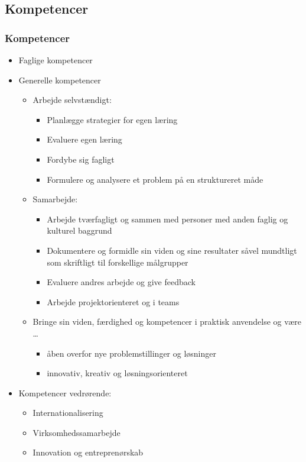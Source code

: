 \documentclass[t, aspectratio=169]{beamer}
\begin{document}
\subsection{Kompetencer}
\begin{frame}[fragile]
  \frametitle{Kompetencer}
  \vspace{-3mm}
  \begin{itemize}
    \pause
    \item Faglige kompetencer
    \pause
    \item Generelle kompetencer
      \begin{itemize}
        \pause
        \item Arbejde selvstændigt:
          \begin{itemize}
            \item Planlægge strategier for egen læring
            \item Evaluere egen læring
            \item Fordybe sig fagligt
            \item Formulere og analysere et problem på en struktureret måde
          \end{itemize}
        \pause
        \item Samarbejde:
          \begin{itemize}
            \item Arbejde tværfagligt og sammen med personer med anden faglig og kulturel
baggrund
            \item Dokumentere og formidle sin viden og sine resultater såvel
mundtligt som skriftligt til forskellige målgrupper
            \item Evaluere andres arbejde og give feedback
            \item Arbejde projektorienteret og i teams
          \end{itemize}
        \pause
        \item Bringe sin viden, færdighed og kompetencer i praktisk anvendelse og være \ldots
          \begin{itemize}
            \item åben overfor nye problemstillinger og løsninger
            \item innovativ, kreativ og løsningsorienteret
          \end{itemize}
      \end{itemize}
    \pause
    \item Kompetencer vedrørende:
      \begin{itemize}
        \item Internationalisering
        \item Virksomhedssamarbejde
        \item Innovation og entreprenørskab
      \end{itemize}
  \end{itemize}
\end{frame}
\end{document}
